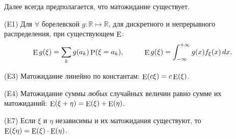 Далее всегда предполагается, что матожидание существует. 

(E1) Для $\forall$ борелевской $g \colon  \mathbb{R} \mapsto \mathbb{R}$, для дискретного и непрерывного распределения, при существующем $\mathop{\mathrm{E}}\nolimits$:
\begin{equation*}
    \E g(\xi) = \sum_k g(a_k) \P(\xi = a_k),
    \hspace{10 mm}
    \E g(\xi) = \int_{-\infty}^{+\infty} g(x) f_\xi (x) \d x.
\end{equation*}

(E3) Матожидание линейно по константам: $\mathop{\mathrm{E}}\nolimits (c \xi) = c \mathop{\mathrm{E}}\nolimits (\xi)$. 

(E4) Матожидание суммы \textit{любых} случайных величин равно сумме их матожиданий: $\mathop{\mathrm{E}}\nolimits (\xi + \eta) = \mathop{\mathrm{E}}\nolimits (\xi) + \mathop{\mathrm{E}}\nolimits (\eta)$.

(E7) Если $\xi$ и $\eta$ независимы и их матожидания существуют, то $\mathop{\mathrm{E}}\nolimits (\xi \eta) = \mathop{\mathrm{E}}\nolimits(\xi) \cdot \mathop{\mathrm{E}}\nolimits(\eta)$.












